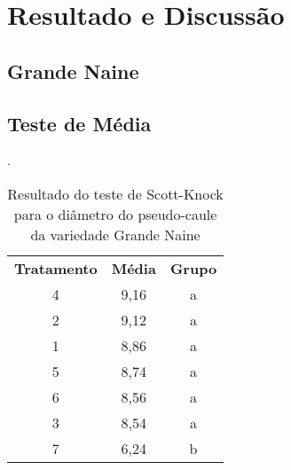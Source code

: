 \chapter{Resultado e Discussão}
\section{Grande Naine}

\section{Teste de Média}
  
 
\begin{table}[!htb]
 	\begin{center}
 		\caption{Resultado do teste de Scott-Knock para o diâmetro do pseudo-caule da variedade Grande Naine}.
	 	\begin{tabular}{ccc}
 		\hline
 		\hline
 		\textbf{Tratamento} & \textbf{Média}  & \textbf{Grupo}\\
 		4 & 9,16 & a \\
 		2 & 9,12 & a \\
 		1 & 8,86 & a \\
 		5 & 8,74 & a \\
 		6 & 8,56  & a \\
 		3 & 8,54  & a \\
 		7 & 6,24   & b \\
		\hline
 		\end{tabular}
 	\end{center}
\end{table}